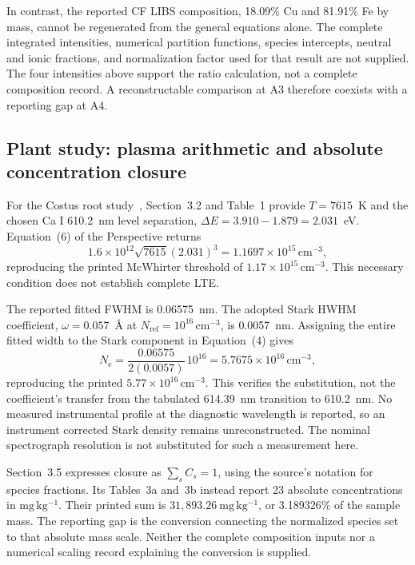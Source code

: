 \documentclass[11pt]{article}
\newcommand{\Ne}{N_{\mathrm e}}
\newcommand{\unitdensity}{\mathrm{cm}^{-3}}
\begin{document}
In contrast, the reported CF LIBS composition, 18.09\% Cu and 81.91\% Fe by mass, cannot be regenerated from the general equations alone. The complete integrated intensities, numerical partition functions, species intercepts, neutral and ionic fractions, and normalization factor used for that result are not supplied. The four intensities above support the ratio calculation, not a complete composition record. A reconstructable comparison at A3 therefore coexists with a reporting gap at A4.

\subsection{Plant study: plasma arithmetic and absolute concentration closure}\label{sec:published-plant}
For the Costus root study~\cite{Aldakheel2024}, Section~3.2 and Table~1 provide $T=7615$~K and the chosen Ca I 610.2~nm level separation, $\Delta E=3.910-1.879=2.031$~eV. Equation~(6) of the Perspective returns
\[
1.6\times10^{12}\sqrt{7615}(2.031)^3
=1.1697\times10^{15}\,\unitdensity,
\]
reproducing the printed McWhirter threshold of $1.17\times10^{15}\,\unitdensity$. This necessary condition does not establish complete LTE.

The reported fitted FWHM is 0.06575~nm. The adopted Stark HWHM coefficient, $\omega=0.057$~\AA{} at $N_{\mathrm{ref}}=10^{16}\,\unitdensity$, is 0.0057~nm. Assigning the entire fitted width to the Stark component in Equation~(4) gives
\[
\Ne=\frac{0.06575}{2(0.0057)}\,10^{16}
=5.7675\times10^{16}\,\unitdensity,
\]
reproducing the printed $5.77\times10^{16}\,\unitdensity$. This verifies the substitution, not the coefficient's transfer from the tabulated 614.39~nm transition to 610.2~nm. No measured instrumental profile at the diagnostic wavelength is reported, so an instrument corrected Stark density remains unreconstructed. The nominal spectrograph resolution is not substituted for such a measurement here.

Section~3.5 expresses closure as $\sum_s C_s=1$, using the source's notation for species fractions. Its Tables~3a and~3b instead report 23 absolute concentrations in $\mathrm{mg\,kg^{-1}}$. Their printed sum is $31{,}893.26~\mathrm{mg\,kg^{-1}}$, or 3.189326\% of the sample mass. The reporting gap is the conversion connecting the normalized species set to that absolute mass scale. Neither the complete composition inputs nor a numerical scaling record explaining the conversion is supplied.
\end{document}

